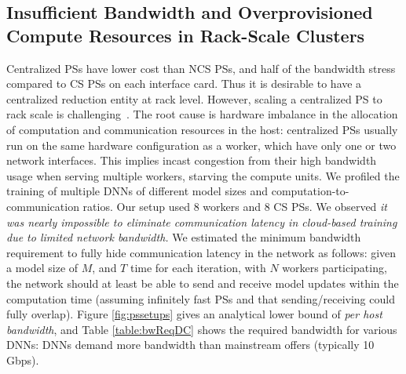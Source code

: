 \subsection{Insufficient Bandwidth and Overprovisioned Compute Resources in Rack-Scale Clusters}
Centralized PSs have lower cost than NCS PSs, and half of the bandwidth stress compared to CS PSs on each interface card. Thus it is desirable to have a centralized reduction entity at rack level. However, scaling a centralized PS to rack scale is challenging~\cite{firecaffe}.
The root cause is hardware imbalance in the allocation of computation and communication resources in the host: centralized PSs usually run on the same hardware configuration as a worker, which have only one or two network interfaces. This implies incast congestion from their high bandwidth usage when serving multiple workers, starving the compute units. We profiled the training of multiple DNNs of different model sizes and computation-to-communication ratios. Our setup used 8 workers and 8 CS PSs. We observed \textit{it was nearly impossible to eliminate communication latency in cloud-based training due to limited network bandwidth.} We estimated the minimum bandwidth requirement to fully hide communication latency in the network as follows: given a model size of $M$, and $T$ time for each iteration, with $N$ workers participating, the network should at least be able to send and receive model updates within the computation time (assuming infinitely fast PSs and that sending/receiving could fully overlap). Figure \ref{fig:pssetups} gives an analytical lower bound of \textit{per host bandwidth}, and Table \ref{table:bwReqDC} shows the required bandwidth for various DNNs: DNNs demand more bandwidth than mainstream offers (typically 10 Gbps). 


